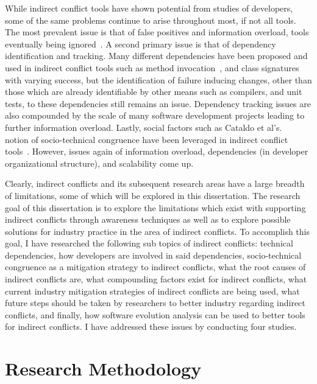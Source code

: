 While indirect conflict tools have shown potential from studies of developers, some of the same problems continue
to arise throughout most, if not all tools. The most prevalent issue is that of false positives and information
overload, tools eventually being
ignored~\cite{Sarma:2007:TSA, Servant:2010:CPI}. A second primary issue is that of dependency identification and
tracking. Many different dependencies have been proposed and used in indirect conflict tools such as method 
invocation~\cite{Trainer:2005:BGT}, and class signatures~\cite{Sarma:2007:TSA} with varying success, but the 
identification of failure inducing changes, other than those which are already identifiable by other means such
as compilers, and unit tests, to these dependencies still remains an issue. Dependency tracking issues are
also compounded by the scale of many software development projects leading to further information overload.
Lastly, social factors such as Cataldo et al's.~\cite{Cataldo:2006:ICR} notion of socio-technical
congruence have been leveraged in indirect conflict tools~\cite{Kwan:2011:ESC, Begel:2010:CDE, Borici:2012:CHA}.
However, issues again of information overload, dependencies (in developer organizational structure), and scalability 
come up.

Clearly, indirect conflicts and its subsequent research areas have a large breadth of limitations, some of which
will be explored in this dissertation. The research goal of this dissertation is to explore the limitations which exist
with supporting indirect conflicts through awareness techniques as well as to explore possible solutions for industry practice 
in the area of indirect conflicts. To accomplish this goal, I have researched the following sub topics of indirect
conflicts: technical dependencies, how developers are involved in said dependencies,
socio-technical congruence as a mitigation strategy to indirect conflicts, what the root causes of indirect conflicts are,
what compounding factors exist for indirect conflicts, what current industry mitigation strategies of indirect conflicts
are being used, what future steps should be taken by researchers to better industry regarding indirect conflicts, and finally,
how software evolution analysis can be used to better tools for indirect conflicts. I have addressed these issues by
conducting four studies.

\section{Research Methodology}


